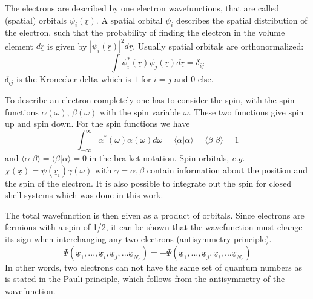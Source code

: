 \documentclass[11pt,DIV=13,BCOR=5mm,a4paper,headinclude]{scrbook}
\renewcommand{\vec}[1]{\underline{#1}}
\begin{document}
The electrons are described by one electron wavefunctions, that are called (spatial) orbitals $\psi_i(\vec{r})$.
A spatial orbital $\psi_i$ describes the spatial distribution of the electron, such that the probability of finding the electron in the volume element $d\vec{r}$ is given by $|\psi_i(\vec{r})|^2d\vec{r}$.
Usually spatial orbitals are orthonormalized:
\begin{equation}
\int \psi_i^\ast(\vec{r})\psi_j(\vec{r})d\vec{r}=\delta_{ij}
\end{equation}
$\delta_{ij}$ is the Kronecker delta which is $1$ for $i=j$ and $0$ else.


To describe an electron completely one has to consider the spin, with the spin functions $\alpha(\omega)$, $\beta(\omega)$ with the spin variable $\omega$.
These two functions give spin up and spin down.
For the spin functions we have
\begin{equation}
\int_{-\infty}^{\infty}\alpha^\ast(\omega)\alpha(\omega)d\omega=\langle\alpha|\alpha\rangle=\langle\beta|\beta\rangle=1
\end{equation}
and $\langle\alpha|\beta\rangle=\langle\beta|\alpha\rangle=0$ in the bra-ket notation.
Spin orbitals, \textit{e.g.} $\chi(\vec{x})=\psi(\vec{r}_i)\gamma(\omega)$ with $\gamma=\alpha, \beta$ contain information about the position and the spin of the electron.
It is also possible to integrate out the spin for closed shell systems which was done in this work.


The total wavefunction is then given as a product of orbitals.
Since electrons are fermions with a spin of 1/2, it can be shown that the wavefunction must change its sign when interchanging any two electrons (antisymmetry principle).
\begin{equation}
\Psi(\vec{x}_1,...,\vec{x}_i,\vec{x}_j,...\vec{x}_{N_e})=-\Psi(\vec{x}_1,...,\vec{x}_j,\vec{x}_i,...\vec{x}_{N_e})
\end{equation}
In other words, two electrons can not have the same set of quantum numbers as is stated in the Pauli principle, which follows from the antisymmetry of the wavefunction.
\end{document}
